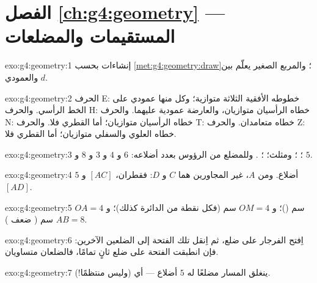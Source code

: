 \section*{الفصل \ref{ch:g4:geometry} --- المستقيمات والمضلعات}

\begin{solution}{exo:g4:geometry:1}
إنشاءات بحسب \cref{met:g4:geometry:draw}؛ والمربع الصغير
يعلّم  بين $d$ والعمودي.
\end{solution}

\begin{solution}{exo:g4:geometry:2}
الحرف E: خطوطه الأفقية الثلاثة متوازية؛ وكل منها عمودي
على الخط الرأسي. والحرف H: خطاه الرأسيان متوازيان،
والعارضة عمودية عليهما. والحرف N: خطاه الرأسيان
متوازيان؛ أما القطري فلا. والحرف T: خطاه
متعامدان. والحرف Z: خطاه العلوي والسفلي متوازيان؛ أما
القطري فلا.
\end{solution}

\begin{solution}{exo:g4:geometry:3}
؛ ؛ ومثلث؛ ؛ . وللمضلع من
الرؤوس بعدد أضلاعه: $6$ و $4$ و $3$ و $8$ و $5$.
\end{solution}

\begin{solution}{exo:g4:geometry:4}
 $5$ أضلاع. ومن $A$، غير المجاورين هما $C$
و $D$: فقطران، $[AC]$ و $[AD]$.
\end{solution}

\begin{solution}{exo:g4:geometry:5}
$OA = 4$ سم ()؛ و $OM = 4$ سم (فكل نقطة من الدائرة كذلك)؛
و $AB = 8$ سم ( ضعف ).
\end{solution}

\begin{solution}{exo:g4:geometry:6}
اِفتح الفرجار على ضلع، ثم اِنقل تلك الفتحة إلى الضلعين
الآخرين: فإن انطبقت الفتحة على ضلع ثانٍ
تمامًا، فالضلعان متساويان.
\end{solution}

\begin{solution}{exo:g4:geometry:7}
ينغلق المسار مضلعًا له $5$ أضلاع --- أي  (وليس
منتظمًا!).
\end{solution}

